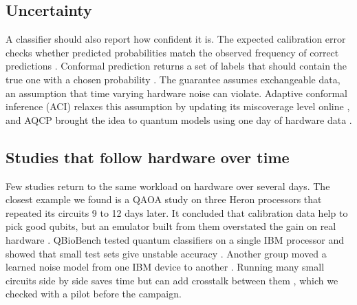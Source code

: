 \documentclass[10pt,conference]{IEEEtran}
\begin{document}
\subsection{Uncertainty}
A classifier should also report how confident it is. The expected calibration error checks
whether predicted probabilities match the observed frequency of correct predictions
\cite{guo2017calibration}. Conformal prediction returns a set of labels that
should contain the true one with a chosen probability \cite{park2023qcp}. The guarantee assumes exchangeable data, an assumption that time varying hardware noise can
violate. Adaptive
conformal inference (ACI) relaxes this assumption by updating its miscoverage level online \cite{gibbs2021aci}, and AQCP
brought the idea to quantum models using one day of hardware data \cite{spencer2026aqcp}.

\subsection{Studies that follow hardware over time}
Few studies return to the same workload on hardware over several days. The closest example we
found is a QAOA study on three Heron processors that repeated its circuits 9 to 12 days later.
It concluded that calibration data help to pick good qubits, but an emulator built from them
overstated the gain on real hardware \cite{qaoa2026drift}. QBioBench tested quantum classifiers on
a single IBM processor and showed that small test sets give unstable accuracy \cite{qbiobench2026}.
Another group moved a learned noise model from one IBM device to another
\cite{farib2026crossdevice}. Running many small circuits side by side saves time but can add crosstalk between them
\cite{murali2020crosstalk,ohkura2022simultaneous}, which we checked with a pilot before the
campaign.
\end{document}
